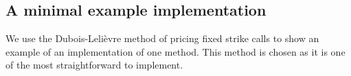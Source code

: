 \documentclass{article}
\begin{document}
\subsection{A minimal example implementation}

We use the Dubois-Leli\`{e}vre method of pricing fixed strike calls to show an example of an implementation of one method. This method is chosen as it is one of the most straightforward to implement.
\scriptsize

\normalsize



\end{document}
